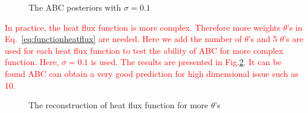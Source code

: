 \documentclass[review]{elsarticle}
\begin{document}
\begin{figure}
    \caption{The ABC posteriors with $\sigma=0.1$}
    \label{fig:appro_post_case1}
\end{figure}

\textcolor{red}{In practice, the heat flux function is more complex. Therefore more weights $\theta$'s in Eq.~\ref{eq:functionheatflux} are needed. Here we add the number of $\theta$'s and 5 $\theta$'s are used for each heat flux function to test the ability of ABC for more complex function. Here, $\sigma=0.1$ is used. The results are presented in Fig.\ref{fig:resultofflux10}. It can be found ABC can obtain a very good prediction for high dimensional issue such as 10.}

\begin{figure}
    \centering
    \centering
    \caption{The reconstruction of heat flux function for more $\theta$'s}
    \label{fig:resultofflux10}
\end{figure}
\end{document}
